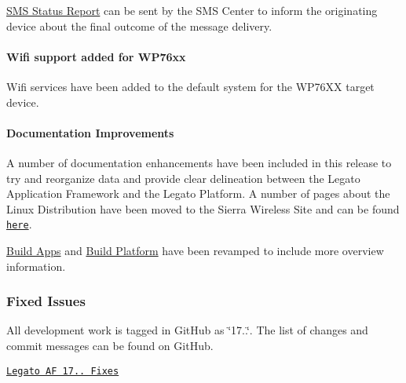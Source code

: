\hyperlink{c_sms_le_sms_ops_statusReport}{S\+MS Status Report} can be sent by the S\+MS Center to inform the originating device about the final outcome of the message delivery.\hypertarget{releaseNotes17090_rn1709_Features_wifi}{}\paragraph{Wifi support added for W\+P76xx}\label{releaseNotes17090_rn1709_Features_wifi}
Wifi services have been added to the default system for the W\+P76\+XX target device.\hypertarget{releaseNotes17090_rn1709_Features_Docs}{}\paragraph{Documentation Improvements}\label{releaseNotes17090_rn1709_Features_Docs}
A number of documentation enhancements have been included in this release to try and reorganize data and provide clear delineation between the Legato Application Framework and the Legato Platform. A number of pages about the Linux Distribution have been moved to the Sierra Wireless Site and can be found \href{https://source.sierrawireless.com/resources/legato/linuxoverview/}{\tt here}.

\hyperlink{buildAppsMain}{Build Apps} and \hyperlink{buildPlatformMain}{Build Platform} have been revamped to include more overview information.\hypertarget{releaseNotes17090_rn1709_Fixes}{}\subsubsection{Fixed Issues}\label{releaseNotes17090_rn1709_Fixes}
All development work is tagged in Git\+Hub as \char`\"{}17..\char`\"{}. The list of changes and commit messages can be found on Git\+Hub.


\begin{DoxyItemize}
\item \href{https://github.com/legatoproject/legato-af/commits/17.09.0}{\tt Legato AF 17.. Fixes}
\end{DoxyItemize}

